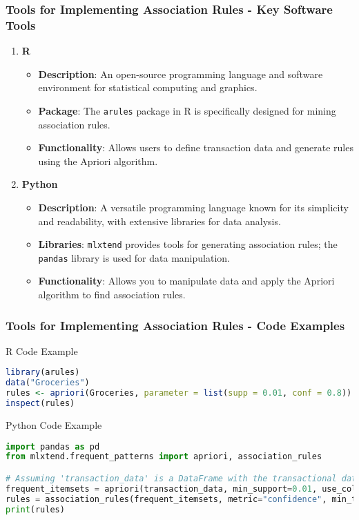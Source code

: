 \documentclass[aspectratio=169]{beamer}
\begin{document}
\begin{frame}[fragile]
    \frametitle{Tools for Implementing Association Rules - Key Software Tools}

    \begin{enumerate}
        \item \textbf{R} 
        \begin{itemize}
            \item \textbf{Description}: An open-source programming language and software environment for statistical computing and graphics.
            \item \textbf{Package}: The \texttt{arules} package in R is specifically designed for mining association rules.
            \item \textbf{Functionality}: Allows users to define transaction data and generate rules using the Apriori algorithm.
        \end{itemize}
        
        \item \textbf{Python}
        \begin{itemize}
            \item \textbf{Description}: A versatile programming language known for its simplicity and readability, with extensive libraries for data analysis.
            \item \textbf{Libraries}: \texttt{mlxtend} provides tools for generating association rules; the \texttt{pandas} library is used for data manipulation.
            \item \textbf{Functionality}: Allows you to manipulate data and apply the Apriori algorithm to find association rules.
        \end{itemize}
    \end{enumerate}
\end{frame}

\begin{frame}[fragile]
    \frametitle{Tools for Implementing Association Rules - Code Examples}
    \begin{block}{R Code Example}
        \begin{lstlisting}[language=R]
library(arules)
data("Groceries") 
rules <- apriori(Groceries, parameter = list(supp = 0.01, conf = 0.8))
inspect(rules)
        \end{lstlisting}
    \end{block}
    
    \begin{block}{Python Code Example}
        \begin{lstlisting}[language=Python]
import pandas as pd
from mlxtend.frequent_patterns import apriori, association_rules

# Assuming 'transaction_data' is a DataFrame with the transactional data
frequent_itemsets = apriori(transaction_data, min_support=0.01, use_colnames=True)
rules = association_rules(frequent_itemsets, metric="confidence", min_threshold=0.8)
print(rules)
        \end{lstlisting}
    \end{block}
\end{frame}
\end{document}
